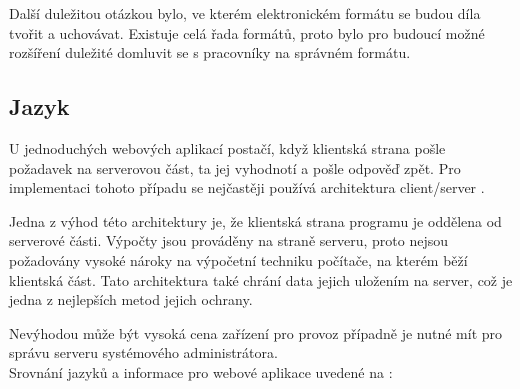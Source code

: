         Další duležitou otázkou bylo, ve kterém elektronickém formátu se budou díla tvořit a uchovávat. Existuje celá řada formátů, proto bylo pro budoucí možné rozšíření duležité domluvit se s pracovníky na správném formátu.
        
        \subsection{Jazyk}
            U jednoduchých webových aplikací postačí, když klientská strana pošle požadavek na serverovou část, ta jej vyhodnotí a pošle odpověď zpět. Pro implementaci tohoto případu se nejčastěji používá architektura client/server \cite{languages}. 

            Jedna z výhod této architektury je, že klientská strana programu je oddělena od serverové části. Výpočty jsou prováděny na straně serveru, proto nejsou požadovány vysoké nároky na výpočetní techniku počítače, na kterém běží klientská část. Tato architektura také chrání data jejich uložením na server, což je jedna z nejlepších metod jejich ochrany.
            
            Nevýhodou může být vysoká cena zařízení pro provoz případně je nutné mít pro správu serveru systémového administrátora.\\
            Srovnání jazyků a informace pro webové aplikace uvedené na \cite{languages}:
            
